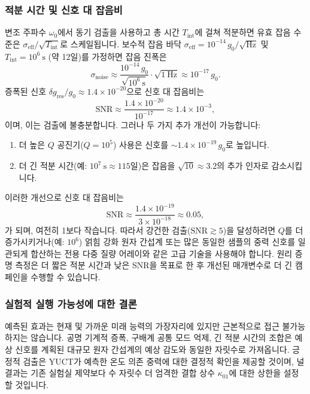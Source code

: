 \documentclass[11pt,a4paper]{article}
\begin{document}
	\subsubsection{적분 시간 및 신호 대 잡음비}
	변조 주파수 $\omega_0$에서 동기 검출을 사용하고 총 시간 $T_{\mathrm{int}}$에 걸쳐 적분하면 유효 잡음 수준은 $\sigma_{\mathrm{eff}} / \sqrt{T_{\mathrm{int}}}$로 스케일됩니다. 보수적 잡음 바닥 $\sigma_{\mathrm{eff}} = 10^{-14}\,g_0/\sqrt{\mathrm{Hz}}$ 및 $T_{\mathrm{int}} = 10^6\ \mathrm{s}$ (약 12일)를 가정하면 잡음 진폭은
	\[
	\sigma_{\mathrm{noise}} \approx \frac{10^{-14}\,g_0}{\sqrt{10^6\ \mathrm{s}}} \cdot \sqrt{1\ \mathrm{Hz}} \approx 10^{-17}\,g_0.
	\]
	증폭된 신호 $\delta g_{\mathrm{res}}/g_0 \approx 1.4\times10^{-20}$으로 신호 대 잡음비는
	\[
	\mathrm{SNR} \approx \frac{1.4\times10^{-20}}{10^{-17}} \approx 1.4\times10^{-3},
	\]
	이며, 이는 검출에 불충분합니다. 그러나 두 가지 추가 개선이 가능합니다:
	\begin{enumerate}
		\item 더 높은 $Q$ 공진기($Q = 10^5$) 사용은 신호를 $\sim 1.4\times10^{-19}\,g_0$로 높입니다.
		\item 더 긴 적분 시간(예: $10^7\ \mathrm{s} \approx 115$일)은 잡음을 $\sqrt{10} \approx 3.2$의 추가 인자로 감소시킵니다.
	\end{enumerate}
	이러한 개선으로 신호 대 잡음비는
	\[
	\mathrm{SNR} \approx \frac{1.4\times10^{-19}}{3\times10^{-18}} \approx 0.05,
	\]
	가 되며, 여전히 1보다 작습니다. 따라서 강건한 검출($\mathrm{SNR} \gtrsim 5$)을 달성하려면 $Q$를 더 증가시키거나(예: $10^6$) 얽힘 강화 원자 간섭계 또는 많은 동일한 샘플의 중력 신호를 일관되게 합산하는 전용 다중 질량 어레이와 같은 고급 기술을 사용해야 합니다. 원리 증명 측정은 더 짧은 적분 시간과 낮은 SNR을 목표로 한 후 개선된 매개변수로 더 긴 캠페인을 수행할 수 있습니다.
	
	\subsubsection{실험적 실행 가능성에 대한 결론}
	예측된 효과는 현재 및 가까운 미래 능력의 가장자리에 있지만 근본적으로 접근 불가능하지는 않습니다. 공명 기계적 증폭, 구배계 공통 모드 억제, 긴 적분 시간의 조합은 예상 신호를 계획된 대규모 원자 간섭계의 예상 감도와 동일한 자릿수로 가져옵니다. 긍정적 검출은 YUCT가 예측한 온도 의존 중력에 대한 결정적 확인을 제공할 것이며, 널 결과는 기존 실험실 제약보다 수 자릿수 더 엄격한 결합 상수 $\kappa_{01}$에 대한 상한을 설정할 것입니다.
	
\end{document}
